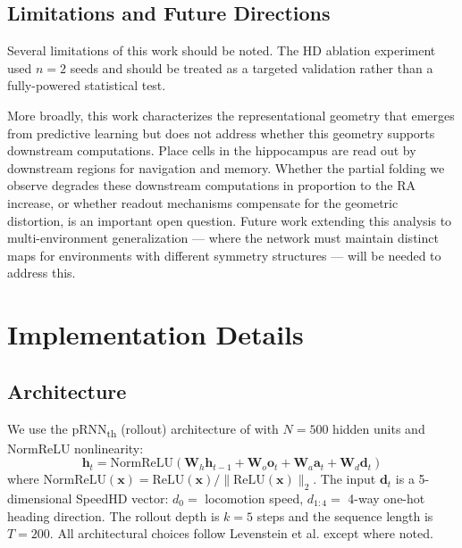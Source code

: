 \documentclass[11pt, a4paper]{article}
\begin{document}
\subsection{Limitations and Future Directions}

Several limitations of this work should be noted. The HD ablation
experiment used $n=2$ seeds and should be treated as a targeted
validation rather than a fully-powered statistical test.

More broadly, this work characterizes the representational geometry that
emerges from predictive learning but does not address whether this
geometry supports downstream computations. Place cells in the hippocampus
are read out by downstream regions for navigation and memory. Whether the
partial folding we observe degrades these downstream computations in
proportion to the RA increase, or whether readout mechanisms compensate
for the geometric distortion, is an important open question. Future work
extending this analysis to multi-environment generalization --- where
the network must maintain distinct maps for environments with different
symmetry structures --- will be needed to address this.









\appendix
\section{Implementation Details}
\label{app:implementation}

\subsection*{Architecture}
We use the pRNN\textsubscript{th} (rollout) architecture of
\citet{levenstein2024} with $N=500$ hidden units and NormReLU nonlinearity:
\begin{equation}
    \mathbf{h}_t = \text{NormReLU}\!\left(\mathbf{W}_h\mathbf{h}_{t-1} +
    \mathbf{W}_o\mathbf{o}_t + \mathbf{W}_a\mathbf{a}_t +
    \mathbf{W}_d\mathbf{d}_t\right)
\end{equation}
where $\text{NormReLU}(\mathbf{x}) = \text{ReLU}(\mathbf{x}) /
\|\text{ReLU}(\mathbf{x})\|_2$. The input $\mathbf{d}_t$ is a 5-dimensional
SpeedHD vector: $d_0 =$ locomotion speed, $d_{1:4} =$ 4-way one-hot
heading direction. The rollout depth is $k=5$ steps and the sequence
length is $T=200$. All architectural choices follow Levenstein et al.
except where noted.
\end{document}
